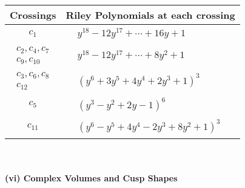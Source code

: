 \documentclass[1p]{elsarticle_modified}
\theoremstyle{definition}
\begin{document}
\begin{tabular}{m{50pt}|m{274pt}}
Crossings & \hspace{64pt}Riley Polynomials at each crossing \\
\hline $$\begin{aligned}c_{1}\end{aligned}$$&$\begin{aligned}
&y^{18}-12 y^{17}+\cdots+16 y+1
\end{aligned}$\\
\hline $$\begin{aligned}c_{2},c_{4},c_{7}\\c_{9},c_{10}\end{aligned}$$&$\begin{aligned}
&y^{18}-12 y^{17}+\cdots+8 y^2+1
\end{aligned}$\\
\hline $$\begin{aligned}c_{3},c_{6},c_{8}\\c_{12}\end{aligned}$$&$\begin{aligned}
&(y^6+3 y^5+4 y^4+2 y^3+1)^3
\end{aligned}$\\
\hline $$\begin{aligned}c_{5}\end{aligned}$$&$\begin{aligned}
&(y^3- y^2+2 y-1)^6
\end{aligned}$\\
\hline $$\begin{aligned}c_{11}\end{aligned}$$&$\begin{aligned}
&(y^6- y^5+4 y^4-2 y^3+8 y^2+1)^3
\end{aligned}$\\
\hline
\end{tabular}\\~\\
\newpage\flushleft \textbf{(vi) Complex Volumes and Cusp Shapes}
\end{document}
